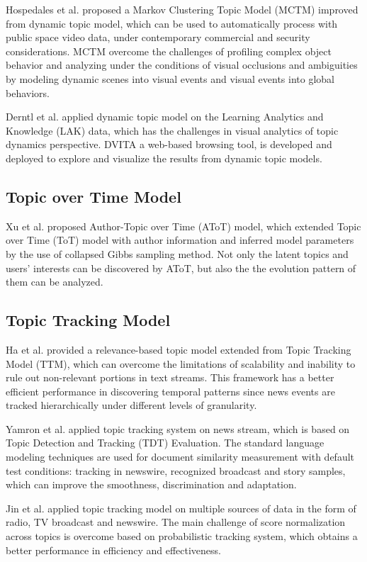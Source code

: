 Hospedales et al. \cite{hospedales2012video} proposed a Markov Clustering Topic Model (MCTM) improved from dynamic topic model, which can be used to automatically process with public space video data, under contemporary commercial and security considerations. MCTM overcome the challenges of profiling complex object behavior and analyzing under the conditions of visual occlusions and ambiguities by modeling dynamic scenes into visual events and visual events into global behaviors.

Derntl et al. \cite{derntl2013dynamic} applied dynamic topic model on the Learning Analytics and Knowledge (LAK) data, which has the challenges in visual analytics of topic dynamics perspective. DVITA a web-based browsing tool, is developed and deployed to explore and visualize the results from dynamic topic models. 


\subsection{Topic over Time Model}
\label{subsec:totApplication}

Xu et al. \cite{xu2014author} proposed Author-Topic over Time (AToT) model, which extended Topic over Time (ToT) model with author information and inferred model parameters by the use of collapsed Gibbs sampling method. Not only the latent topics and users’ interests can be discovered by AToT, but also the the evolution pattern of them can be analyzed.

\subsection{Topic Tracking Model}
\label{subsec:ttmApplication}

Ha et al. \cite{ha2009relevance} provided a relevance-based topic model extended from Topic Tracking Model (TTM), which can overcome the limitations of scalability and inability to rule out non-relevant portions in text streams. This framework has a better efficient performance in discovering temporal patterns  since news events are tracked hierarchically under different levels of granularity.

Yamron et al. \cite{yamron1999topic} applied topic tracking system on news stream, which is based on Topic Detection and Tracking (TDT) Evaluation. The standard language modeling techniques are used for document similarity measurement with default test conditions: tracking in newswire, recognized broadcast and story samples, which can improve the smoothness, discrimination and adaptation.

Jin et al. \cite{jin1999topic} applied topic tracking model on multiple sources of data in the form of radio, TV broadcast and newswire. The main challenge of score normalization across topics is overcome based on probabilistic tracking system, which obtains a better performance in efficiency and effectiveness. 




 